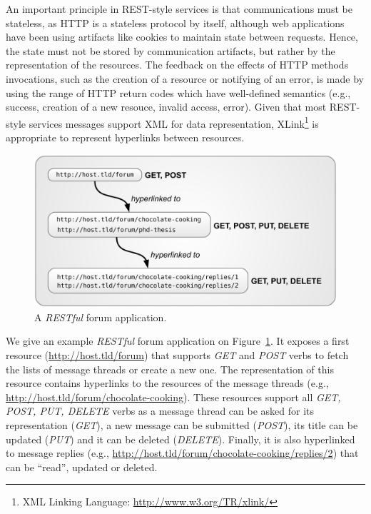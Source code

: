 An important principle in REST-style services is that communications must be stateless, as HTTP is a stateless protocol by itself, although web applications have been using artifacts like cookies to maintain state between requests. Hence, the state must not be stored by communication artifacts, but rather by the representation of the resources. The feedback on the effects of HTTP methods invocations, such as the creation of a resource or notifying of an error, is made by using the range of HTTP return codes which have well-defined semantics (e.g., success, creation of a new resouce, invalid access, error). Given that most REST-style services messages support XML for data representation, XLink\footnote{XML Linking Language: \url{http://www.w3.org/TR/xlink/}} is appropriate to represent hyperlinks between resources.\\

\begin{figure}[htbp]
    \centering
    \includegraphics[width=\textwidth]{content/web-services/restful-forum}
    \caption{A \emph{RESTful} forum application.} 
    \label{fig:rest-forum}
\end{figure}

We give an example \emph{RESTful} forum application on Figure~\ref{fig:rest-forum}. It exposes a first resource (\url{http://host.tld/forum}) that supports \emph{GET} and \emph{POST} verbs to fetch the lists of message threads or create a new one. The representation of this resource contains hyperlinks to the resources of the message threads (e.g., \url{http://host.tld/forum/chocolate-cooking}). These resources support all \emph{GET, POST, PUT, DELETE} verbs as a message thread can be asked for its representation (\emph{GET}), a new message can be submitted (\emph{POST}), its title can be updated (\emph{PUT}) and it can be deleted (\emph{DELETE}). Finally, it is also hyperlinked to message replies (e.g., \url{http://host.tld/forum/chocolate-cooking/replies/2}) that can be ``read'', updated or deleted.\\

